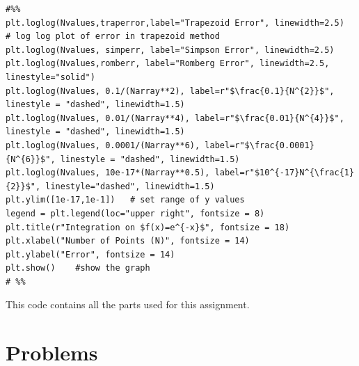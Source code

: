 \documentclass[aps,prb,groupedaddress,nofootinbib,floatfix]{revtex4}
\begin{document}
\begin{lstlisting}
#%%
plt.loglog(Nvalues,traperror,label="Trapezoid Error", linewidth=2.5)   # log log plot of error in trapezoid method
plt.loglog(Nvalues, simperr, label="Simpson Error", linewidth=2.5) 
plt.loglog(Nvalues,romberr, label="Romberg Error", linewidth=2.5, linestyle="solid")
plt.loglog(Nvalues, 0.1/(Narray**2), label=r"$\frac{0.1}{N^{2}}$", linestyle = "dashed", linewidth=1.5)
plt.loglog(Nvalues, 0.01/(Narray**4), label=r"$\frac{0.01}{N^{4}}$", linestyle = "dashed", linewidth=1.5)
plt.loglog(Nvalues, 0.0001/(Narray**6), label=r"$\frac{0.0001}{N^{6}}$", linestyle = "dashed", linewidth=1.5)
plt.loglog(Nvalues, 10e-17*(Narray**0.5), label=r"$10^{-17}N^{\frac{1}{2}}$", linestyle="dashed", linewidth=1.5)
plt.ylim([1e-17,1e-1])   # set range of y values
legend = plt.legend(loc="upper right", fontsize = 8)
plt.title(r"Integration on $f(x)=e^{-x}$", fontsize = 18)
plt.xlabel("Number of Points (N)", fontsize = 14)
plt.ylabel("Error", fontsize = 14)
plt.show()    #show the graph
# %%
\end{lstlisting}
This code contains all the parts used for this assignment. 
\section*{Problems}
\end{document}
